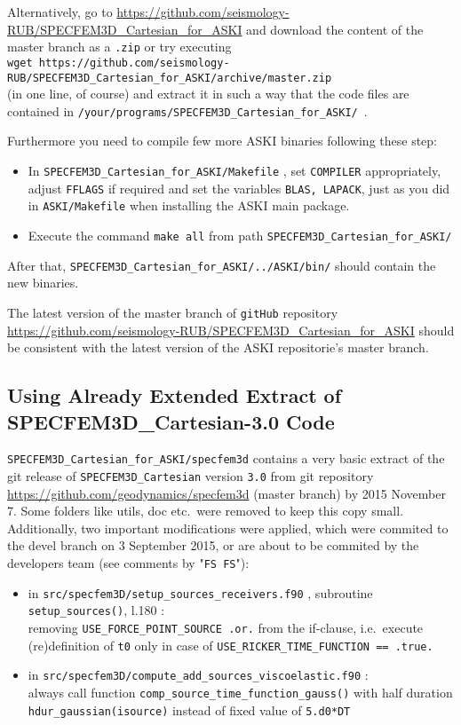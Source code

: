 \documentclass[12pt,a4paper]{article}
\newcommand{\lcode}[1]{\nolinkurl{#1}}
\newcommand{\lcodetitle}[1]{ {\ttfamily #1} }
\newcommand{\ASKI}{ {\ttfamily ASKI} }
\begin{document}
Alternatively, go to \url{https://github.com/seismology-RUB/SPECFEM3D_Cartesian_for_ASKI} and download the 
content of the master branch as a \lcode{.zip} or try executing\\
\lcode{wget https://github.com/seismology-RUB/SPECFEM3D_Cartesian_for_ASKI/archive/master.zip}\\
(in one line, of course) and extract it in such a way that the code files are contained in 
\lcode{/your/programs/SPECFEM3D_Cartesian_for_ASKI/}~.

Furthermore you need to compile few more \ASKI{} binaries following these step:
\begin{itemize}
\item In \lcode{SPECFEM3D_Cartesian_for_ASKI/Makefile} , set \lcode{COMPILER} appropriately, 
   adjust \lcode{FFLAGS} if required and set the variables \lcode{BLAS, LAPACK}, just as you did 
   in \lcode{ASKI/Makefile} when installing the \ASKI{} main package.
\item Execute the command \lcode{make all} from path \lcode{SPECFEM3D_Cartesian_for_ASKI/}
\end{itemize}
After that, \lcode{SPECFEM3D_Cartesian_for_ASKI/../ASKI/bin/} should contain the new binaries.

The latest version of the master branch of \lcode{gitHub} repository 
\url{https://github.com/seismology-RUB/SPECFEM3D_Cartesian_for_ASKI} should be consistent with 
the latest version of the \ASKI{} repositorie's master branch.
\subsection{Using Already Extended Extract of \lcodetitle{SPECFEM3D\_Cartesian-3.0} Code} \label{use_modified_SPECFEM}
\lcode{SPECFEM3D_Cartesian_for_ASKI/specfem3d} contains a very basic extract of the git release of 
\lcode{SPECFEM3D_Cartesian} version \lcode{3.0} from git repository 
\url{https://github.com/geodynamics/specfem3d} (master branch) by
2015 November 7. Some folders like utils, doc etc.\ were removed to keep this copy small.
Additionally, two important modifications were applied, which were commited
to the devel branch on 3 September 2015, or are about to be commited by the 
developers team (see comments by "\lcode{FS FS}"):
\begin{itemize}
\item in \lcode{src/specfem3D/setup_sources_receivers.f90} , subroutine \lcode{setup_sources()}, l.180 :\\
   removing \lcode{USE_FORCE_POINT_SOURCE .or.} from the if-clause, i.e.\ execute
   (re)definition of \lcode{t0} only in case of \lcode{USE_RICKER_TIME_FUNCTION == .true.}
 \item in \lcode{src/specfem3D/compute_add_sources_viscoelastic.f90} :\\
   always call function \lcode{comp_source_time_function_gauss()} with half duration
   \lcode{hdur_gaussian(isource)} instead of fixed value of \lcode{5.d0*DT}
\end{itemize}
\end{document}
